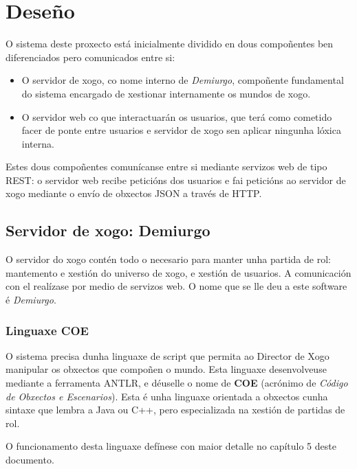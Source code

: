\chapter{Deseño}


O sistema deste proxecto está inicialmente dividido en dous compoñentes ben
diferenciados pero comunicados entre si:
\begin{itemize}
  \item O servidor de xogo, co nome interno de {\it Demiurgo},
  compoñente fundamental do sistema encargado de xestionar internamente os
  mundos de xogo.
  \item O servidor web co que interactuarán os usuarios, que terá como cometido
  facer de ponte entre usuarios e servidor de xogo sen aplicar ningunha lóxica
  interna.
\end{itemize}

Estes dous compoñentes comunícanse entre si mediante servizos web de tipo REST:
o servidor web recibe peticións dos usuarios e fai peticións ao servidor de
xogo mediante o envío de obxectos JSON a través de HTTP.

\section{Servidor de xogo: Demiurgo}
O servidor do xogo contén todo o necesario para manter unha partida de rol:
mantemento e xestión do universo de xogo, e xestión de usuarios. A comunicación
con el realízase por medio de servizos web. O nome que se lle deu a este
software é {\it Demiurgo}.
\subsection{Linguaxe COE}
O sistema precisa dunha linguaxe de script que permita ao Director de
Xogo manipular os obxectos que compoñen o mundo. Esta linguaxe desenvolveuse
mediante a ferramenta ANTLR, e déuselle o nome de {\bf COE} (acrónimo de {\it
Código de Obxectos e Escenarios}). Esta é unha linguaxe orientada a obxectos
cunha sintaxe que lembra a Java ou C++, pero especializada na xestión de
partidas de rol.
\par
O funcionamento desta linguaxe defínese con maior detalle no capítulo 5 deste
documento.

